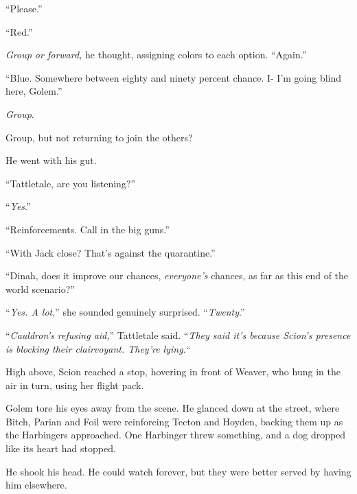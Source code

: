 ``Please.''



``Red.''



\emph{Group or forward, }he thought, assigning colors to each option.  ``Again.''



``Blue.  Somewhere between eighty and ninety percent chance.  I- I'm going blind here, Golem.''



\emph{Group}.



Group, but not returning to join the others?



He went with his gut.



``Tattletale, are you listening?''



``\emph{Yes}.''



``Reinforcements.  Call in the big guns.''



``With Jack close?  That's against the quarantine.''



``Dinah, does it improve our chances, \emph{everyone's} chances, as far as this end of the world scenario?''



``\emph{Yes.  A lot},'' she sounded genuinely surprised.  ``\emph{Twenty}.''



``\emph{Cauldron's refusing aid,}'' Tattletale said.  ``\emph{They said it's because Scion's presence is blocking their clairvoyant.  They're lying.}``



High above, Scion reached a stop, hovering in front of Weaver, who hung in the air in turn, using her flight pack.



Golem tore his eyes away from the scene.  He glanced down at the street, where Bitch, Parian and Foil were reinforcing Tecton and Hoyden, backing them up as the Harbingers approached.  One Harbinger threw something, and a dog dropped like its heart had stopped.



He shook his head.  He could watch forever, but they were better served by having him elsewhere.



